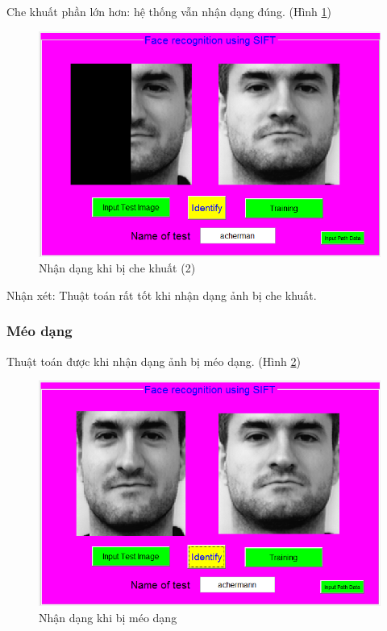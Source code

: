 \documentclass[conference]{IEEEtran}
\begin{document}
Che khuất phần lớn hơn: hệ thống vẫn nhận dạng đúng. (Hình \ref{fig:bieudo5_tinh})
\begin{figure}
  \includegraphics[width=\linewidth]{bieudo5_tinh}
  \caption{Nhận dạng khi bị che khuất (2)}
  \label{fig:bieudo5_tinh}
\end{figure} 
    
    Nhận xét: Thuật toán rất tốt khi nhận dạng ảnh bị che khuất.
    
\subsubsection{Méo dạng}

Thuật toán được khi nhận dạng ảnh bị méo dạng. (Hình \ref{fig:bieudo6_tinh})
\begin{figure}
  \includegraphics[width=\linewidth]{bieudo6_tinh}
  \caption{Nhận dạng khi bị méo dạng}
  \label{fig:bieudo6_tinh}
\end{figure} 
\end{document}
